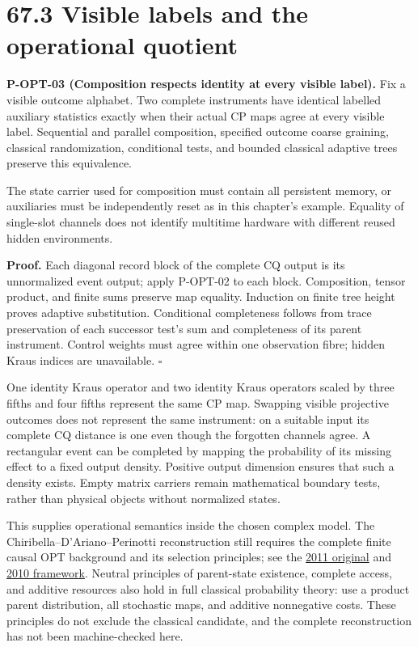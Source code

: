 \documentclass[
  11pt,
  oneside]{book}
\begin{document}
\section{67.3 Visible labels and the operational quotient}

\label{p-opt-03}{}

\textbf{P-OPT-03 (Composition respects identity at every visible
label).} Fix a visible outcome alphabet. Two complete instruments have
identical labelled auxiliary statistics exactly when their actual CP
maps agree at every visible label. Sequential and parallel composition,
specified outcome coarse graining, classical randomization, conditional
tests, and bounded classical adaptive trees preserve this equivalence.

The state carrier used for composition must contain all persistent
memory, or auxiliaries must be independently reset as in this chapter's
example. Equality of single-slot channels does not identify multitime
hardware with different reused hidden environments.

\textbf{Proof.} Each diagonal record block of the complete CQ output is
its unnormalized event output; apply P-OPT-02 to each block.
Composition, tensor product, and finite sums preserve map equality.
Induction on finite tree height proves adaptive substitution.
Conditional completeness follows from trace preservation of each
successor test's sum and completeness of its parent instrument. Control
weights must agree within one observation fibre; hidden Kraus indices
are unavailable. \(\square\)

One identity Kraus operator and two identity Kraus operators scaled by
three fifths and four fifths represent the same CP map. Swapping visible
projective outcomes does not represent the same instrument: on a
suitable input its complete CQ distance is one even though the forgotten
channels agree. A rectangular event can be completed by mapping the
probability of its missing effect to a fixed output density. Positive
output dimension ensures that such a density exists. Empty matrix
carriers remain mathematical boundary tests, rather than physical
objects without normalized states.

This supplies operational semantics inside the chosen complex model. The
Chiribella--D'Ariano--Perinotti reconstruction still requires the
complete finite causal OPT background and its selection principles; see
the \href{https://arxiv.org/abs/1011.6451v3}{2011 original} and
\href{https://arxiv.org/abs/0908.1583v5}{2010 framework}. Neutral
principles of parent-state existence, complete access, and additive
resources also hold in full classical probability theory: use a product
parent distribution, all stochastic maps, and additive nonnegative
costs. These principles do not exclude the classical candidate, and the
complete reconstruction has not been machine-checked here.
\end{document}

